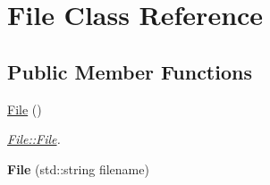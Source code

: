 \hypertarget{classFile}{}\section{File Class Reference}
\label{classFile}
\subsection*{Public Member Functions}
\begin{DoxyCompactItemize}
\item 
\hyperlink{classFile_ae039af5807fc385f41b60644725d15d0}{File} ()
\begin{DoxyCompactList}\small\item\em \hyperlink{classFile_ae039af5807fc385f41b60644725d15d0}{File\+::\+File}. \end{DoxyCompactList}\item 
\hypertarget{classFile_abd2dacf27133c9d5595ecc414299f1a3}{}{\bfseries File} (std\+::string filename)\label{classFile_abd2dacf27133c9d5595ecc414299f1a3}


\end{DoxyCompactItemize}
